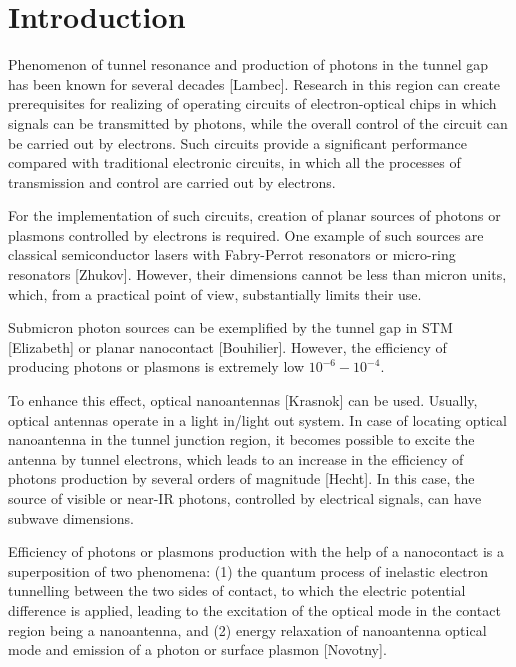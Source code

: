 \documentclass[%
 reprint,
 amsmath,amssymb,
prb,
]{revtex4-1}
\begin{document}

\section{\label{sec:intro}Introduction}



Phenomenon of tunnel resonance and production of photons in the tunnel gap has been known for several decades [Lambec]. Research in this region can create prerequisites for realizing of operating circuits of electron-optical chips in which signals can be transmitted by photons, while the overall control of the circuit can be carried out by electrons. Such circuits provide a significant performance compared with traditional electronic circuits, in which all the processes of transmission and control are carried out by electrons.

For the implementation of such circuits, creation of planar sources of photons or plasmons controlled by electrons is required. One example of such sources are classical semiconductor lasers with Fabry-Perrot resonators or micro-ring resonators [Zhukov]. However, their dimensions cannot be less than micron units, which, from a practical point of view, substantially limits their use.

Submicron photon sources can be exemplified by the tunnel gap in STM [Elizabeth] or planar nanocontact [Bouhilier]. However, the efficiency of producing photons or plasmons is extremely low $10^{-6}-10^{-4}$.

To enhance this effect, optical nanoantennas [Krasnok] can be used. Usually, optical antennas operate in a light in/light out system. In case of locating optical nanoantenna in the tunnel junction region, it becomes possible to excite the antenna by tunnel electrons, which leads to an increase in the efficiency of photons production by several orders of magnitude [Hecht]. In this case, the source of visible or near-IR photons, controlled by electrical signals, can have subwave dimensions.

Efficiency of photons or plasmons production with the help of a nanocontact is a superposition of two phenomena: (1) the quantum process of inelastic electron tunnelling between the two sides of contact, to which the electric potential difference is applied, leading to the excitation of the optical mode in the contact region being a nanoantenna, and (2) energy relaxation of nanoantenna optical mode and emission of a photon or surface plasmon [Novotny].
\end{document}
